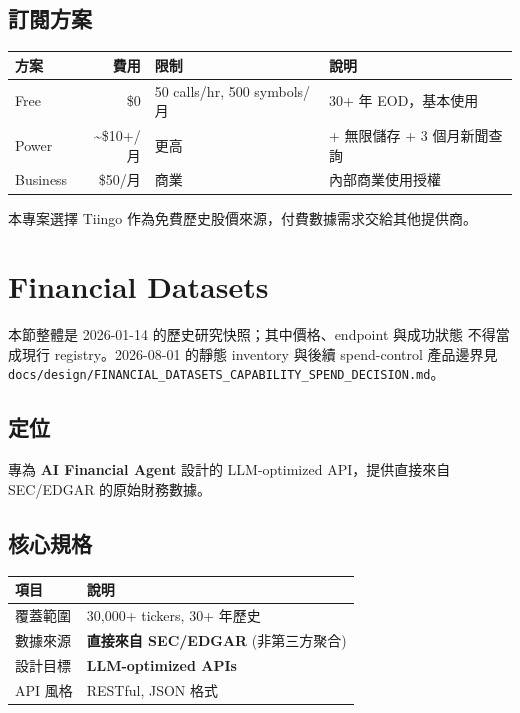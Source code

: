 \documentclass[11pt,a4paper]{article}
\begin{document}
\subsection{訂閱方案}

\begin{table}[H]
\centering
\begin{tabular}{@{}lrll@{}}
\toprule
\textbf{方案} & \textbf{費用} & \textbf{限制} & \textbf{說明} \\
\midrule
Free & \$0 & 50 calls/hr, 500 symbols/月 & 30+ 年 EOD，基本使用 \\
Power & \textasciitilde\$10+/月 & 更高 & + 無限儲存 + 3 個月新聞查詢 \\
Business & \$50/月 & 商業 & 內部商業使用授權 \\
\bottomrule
\end{tabular}
\end{table}

本專案選擇 Tiingo 作為免費歷史股價來源，付費數據需求交給其他提供商。

\newpage
\section{Financial Datasets}

本節整體是 2026-01-14 的歷史研究快照；其中價格、endpoint 與成功狀態
不得當成現行 registry。2026-08-01 的靜態 inventory 與後續
spend-control 產品邊界見
\texttt{docs/design/FINANCIAL\_DATASETS\_CAPABILITY\_SPEND\_DECISION.md}。

\subsection{定位}
專為 \textbf{AI Financial Agent} 設計的 LLM-optimized API，提供直接來自 SEC/EDGAR 的原始財務數據。

\subsection{核心規格}

\begin{table}[H]
\centering
\begin{tabular}{@{}ll@{}}
\toprule
\textbf{項目} & \textbf{說明} \\
\midrule
覆蓋範圍 & 30,000+ tickers, 30+ 年歷史 \\
數據來源 & \textbf{直接來自 SEC/EDGAR} (非第三方聚合) \\
設計目標 & \textbf{LLM-optimized APIs} \\
API 風格 & RESTful, JSON 格式 \\
\bottomrule
\end{tabular}
\end{table}
\end{document}
